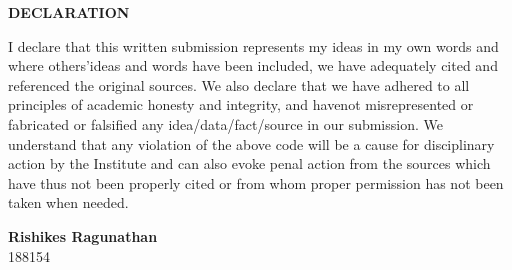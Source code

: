 \begin{center}
    \textbf{\Large DECLARATION}
\end{center}
I declare that this written submission represents my ideas in my own words and where others’ideas and words have been included, 
we have adequately cited and referenced the original sources.
We also declare that we have adhered to all principles of academic honesty and integrity, 
and havenot misrepresented or fabricated or falsified any idea/data/fact/source in our submission. 
We understand that any violation of the above code will be a cause for disciplinary action by the Institute
and can also evoke penal action from the sources which have thus not been properly cited or from whom proper permission has not been taken when needed. 

\vspace{1cm}

\begin{flushleft}
    \textbf{Rishikes Ragunathan}\\
    188154

\end{flushleft}

\newpage